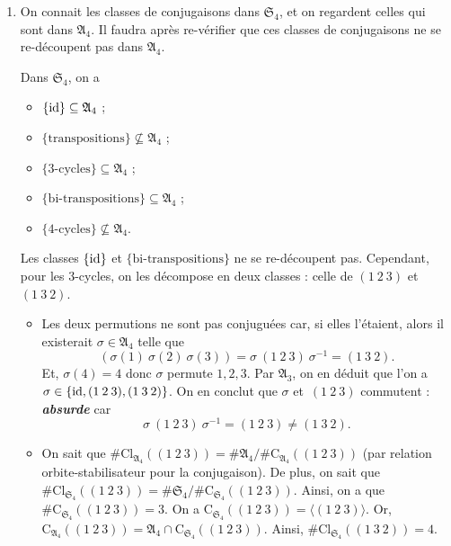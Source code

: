 \documentclass[./main]{subfiles}
\begin{document}
  \begin{enumerate}
    \item On connait les classes de conjugaisons dans $\mathfrak{S}_4$, et on regardent celles qui sont dans $\mathfrak{A}_4$.
      Il faudra après re-vérifier que ces classes de conjugaisons ne se re-découpent pas dans $\mathfrak{A}_4$.

      Dans $\mathfrak{S}_4$, on a 
       \begin{itemize}
         \item $\{\operatorname{id}\} \subseteq \mathfrak{A}_4$ ;
         \item $\{\text{transpositions}\} \not \subseteq \mathfrak{A}_4$ ;
         \item $\{\text{3-cycles}\} \subseteq \mathfrak{A}_4$ ;
         \item $\{\text{bi-transpositions}\} \subseteq \mathfrak{A}_4$ ;
         \item $\{\text{4-cycles}\} \not \subseteq \mathfrak{A}_4$.
      \end{itemize}

      Les classes $\{\operatorname{id}\}$ et $\{\text{bi-transpositions}\}$ ne se re-découpent pas.
      Cependant, pour les $3$-cycles, on les décompose en deux classes :
      celle de $(1\:2\:3)$ et  $(1\:3\:2)$.
       \begin{itemize}
         \item Les deux permutions ne sont pas conjuguées car, si elles l'étaient, alors il existerait $\sigma \in \mathfrak{A}_4$ telle que 
           \[
             (\sigma(1)\:\sigma(2)\:\sigma(3)) = \sigma\: (1\:2\:3)\: \sigma^{-1} = (1\:3\:2)
           .\]
           Et, $\sigma(4) = 4$ donc  $\sigma$ permute $1,2,3$.
           Par $\mathfrak{A}_3$, on en déduit que l'on a~$\sigma \in \{\operatorname{id}, (1\:2\:3), (1\:3\:2)\}$.
           On en conclut que $\sigma$ et~$(1\:2\:3)$ commutent : \textit{\textbf{absurde}} car \[
           \sigma\:(1\:2\:3)\: \sigma^{-1} = (1\:2\:3) \neq (1\:3\:2)
           .\]
         \item On sait que $\# \mathrm{Cl}_{\mathfrak{A}_4}((1\:2\:3)) = \# \mathfrak{A}_4 / \# \mathrm{C}_{\mathfrak{A}_4}((1\:2\:3))$ (par relation orbite-stabilisateur pour la conjugaison).
           De plus, on sait que $\# \mathrm{Cl}_{\mathfrak{S}_4}((1\:2\:3)) = \#\mathfrak{S}_4 / \# \mathrm{C}_{\mathfrak{S}_4}((1\:2\:3))$.
           Ainsi, on a que $\# \mathrm{C}_{\mathfrak{S}_4}((1\:2\:3)) = 3$.
           On a $\mathrm{C}_{\mathfrak{S}_4}((1\:2\:3)) = \langle (1\:2\:3)\rangle$.
           Or,~$\mathrm{C}_{\mathfrak{A}_4}((1\:2\:3)) = \mathfrak{A}_4 \cap \mathrm{C}_{\mathfrak{S}_4}((1\:2\:3))$.
           Ainsi, $\# \mathrm{Cl}_{\mathfrak{S}_4}((1\:3\:2)) = 4$.


\end{itemize}
\end{enumerate}
\end{document}
